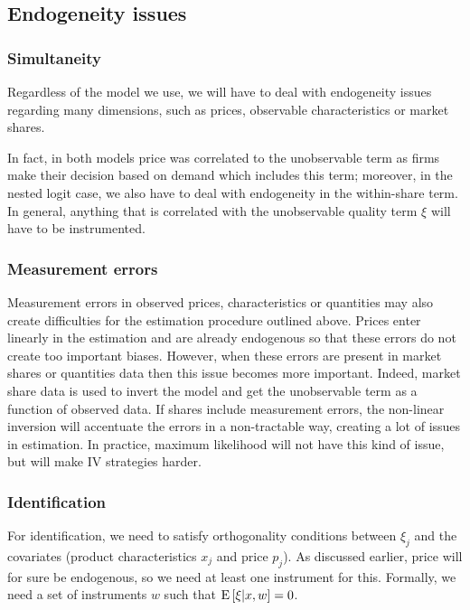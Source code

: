 \subsection{Endogeneity issues}

\subsubsection{Simultaneity}

Regardless of the model we use, we will have to deal with endogeneity issues regarding many dimensions, such as prices, observable characteristics or market shares. 

In fact, in both models price was correlated to the unobservable term as firms make their decision based on demand which includes this term; moreover, in the nested logit case, we also have to deal with endogeneity in the within-share term. In general, anything that is correlated with the unobservable quality term $\xi$ will have to be instrumented.

\subsubsection{Measurement errors}

Measurement errors in observed prices, characteristics or quantities may also create difficulties for the estimation procedure outlined above. Prices enter linearly in the estimation and are already endogenous so that these errors do not create too important biases. However, when these errors are present in market shares or quantities data then this issue becomes more important. Indeed, market share data is used to invert the model and get the unobservable term as a function of observed data. If shares include measurement errors, the non-linear inversion will accentuate the errors in a non-tractable way, creating a lot of issues in estimation. In practice, maximum likelihood will not have this kind of issue, but will make IV strategies harder.

\subsubsection{Identification}

For identification, we need to satisfy orthogonality conditions between $\xi_j$ and the covariates (product characteristics $x_j$ and price $p_j$). As discussed earlier, price will for sure be endogenous, so we need at least one instrument for this. Formally, we need a set of instruments $w$ such that $\operatorname{E}\left[\xi|x, w\right] = 0$. 

